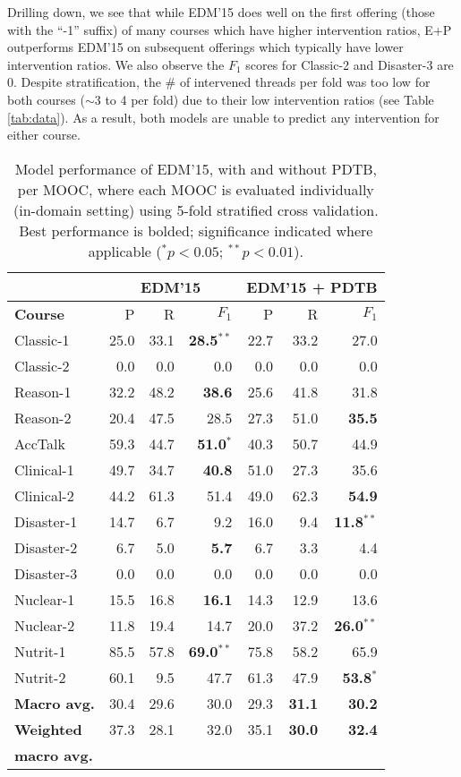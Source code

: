 \documentclass[letterpaper]{article}
\begin{document}
Drilling down, we see that while EDM'15 does well on the first 
offering (those with the ``-1'' suffix) of many courses
which have higher intervention ratios, E+P outperforms EDM'15 on subsequent 
offerings which typically have lower intervention ratios.
We also observe the $F_1$ scores for {\sc Classic-2} and {\sc Disaster-3} are 0.
Despite stratification, the \# of intervened threads per fold was 
too low for both courses ($\sim$3 to 4 per fold) due to their low intervention 
ratios (see Table \ref{tab:data}). As a result, both models are unable to 
predict any intervention for either course.
\begin{table}
\centering
\def\arraystretch{1.15}%
\small
\begin{tabular}{|l|r|r|r||r|r|r|}
\hline 
&
\multicolumn{3}{c||}{EDM'15} & 
\multicolumn{3}{c|}{EDM'15 + PDTB}
\\
\hline
\bf Course&  P&  R& $F_1$& P&  R& $F_1$\\
\hline
{\sc Classic-1}& 25.0& 33.1& \textbf{28.5$^{**}$}& 22.7& 33.2& 27.0\\
\hline
{\sc Classic-2}& 0.0& 0.0& 0.0& 0.0& 0.0& 0.0\\
\hline
{\sc Reason-1}& 32.2& 48.2& \textbf{38.6}& 25.6& 41.8& 31.8\\
\hline
{\sc Reason-2}& 20.4& 47.5& 28.5& 27.3& 51.0& \textbf{35.5}\\
\hline
\hline
{\sc AccTalk}& 59.3& 44.7& \textbf{51.0}$^*$& 40.3& 50.7& 44.9\\
\hline
{\sc Clinical-1}& 49.7& 34.7& \textbf{40.8}& 51.0& 27.3& 35.6\\
\hline
{\sc Clinical-2}& 44.2& 61.3& 51.4& 49.0& 62.3& \textbf{54.9}\\
\hline
{\sc Disaster-1}& 14.7& 6.7& 9.2& 16.0& 9.4& \textbf{11.8$^{**}$}\\
\hline
{\sc Disaster-2}& 6.7& 5.0& \textbf{5.7}& 6.7& 3.3& 4.4\\
\hline
{\sc Disaster-3}& 0.0& 0.0& 0.0& 0.0& 0.0& 0.0\\
\hline
{\sc Nuclear-1}& 15.5& 16.8& \textbf{16.1}& 14.3& 12.9& 13.6\\
\hline
{\sc Nuclear-2}& 11.8& 19.4& 14.7& 20.0& 37.2& \textbf{26.0$^{**}$}\\
\hline
{\sc Nutrit-1}& 85.5& 57.8& \textbf{69.0$^{**}$}& 75.8& 58.2& 65.9\\
\hline
{\sc Nutrit-2}& 60.1& 9.5& 47.7& 61.3& 47.9& \textbf{53.8$^*$}\\
\hline
\hline
\textbf{Macro avg.}& 30.4& 29.6& 30.0& 29.3& \textbf{31.1}& \textbf{30.2}\\
\hline
\textbf{Weighted} & 37.3& 28.1& 32.0& 35.1& \textbf{30.0}& \textbf{32.4}\\
\textbf{macro avg.}& & & & & &\\
\hline
\end{tabular}
\caption{Model performance of EDM'15, with and without PDTB,
per MOOC, where each MOOC is evaluated individually 
(in-domain setting) using 5-fold stratified cross validation. 
Best performance is bolded; significance indicated where applicable 
($^* p < 0.05$; $^{**}p < 0.01$).}
\label{tab:resultIn}
\end{table}
\end{document}
